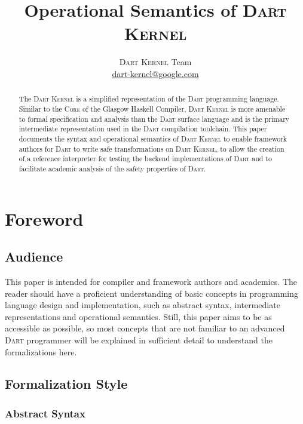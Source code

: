 \documentclass[a4paper,oneside,fleqn]{article}
\newcommand{\kernel}{\textsc{Dart Kernel}}
\newcommand{\dart}{\textsc{Dart}}
\begin{document}
\title{Operational Semantics of \kernel{}}
\author{\kernel{} Team \\ \href{mailto:dart-kernel@google.com}{dart-kernel@google.com}}

\maketitle

\begin{abstract}

The \kernel{} is a simplified representation of the \dart{} programming language.
Similar to the \textsc{Core} of the Glasgow Haskell Compiler, \kernel{} is more amenable to formal specification and analysis than the \dart{} surface language and is the primary intermediate representation used in the \dart{} compilation toolchain.
This paper documents the syntax and operational semantics of \kernel{} to enable framework authors for \dart{} to write safe transformations on \kernel{}, to allow the creation of a reference interpreter for testing the backend implementations of \dart{} and to facilitate academic analysis of the safety properties of \dart{}.

\end{abstract}

\setcounter{tocdepth}{2}
\tableofcontents

\section{Foreword}

\subsection{Audience}
This paper is intended for compiler and framework authors and academics.
The reader should have a proficient understanding of basic concepts in programming language design and implementation, such as abstract syntax, intermediate representations and operational semantics.
Still, this paper aims to be as accessible as possible, so most concepts that are not familiar to an advanced \dart{} programmer will be explained in sufficient detail to understand the formalizations here.

\subsection{Formalization Style}

\subsubsection{Abstract Syntax}
\end{document}
